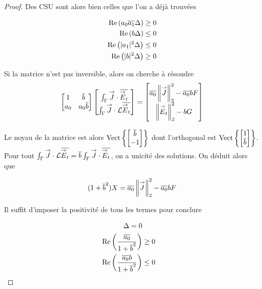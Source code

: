 \begin{proof}
        Des CSU sont alors bien celles que l'on a déjà trouvées

          \begin{align}
          \operatorname{Re}\left(a_0{\overline{a_1}}\Delta\right) &\ge 0
          \\
          \operatorname{Re}\left(b\Delta\right) &\le 0
          \\
          \operatorname{Re}\left(|a_1|^2\Delta\right) &\le 0
          \\
          \operatorname{Re}\left(|b|^2\Delta\right) &\ge 0
        \end{align}

        Si la matrice n'est pas inversible, alors on cherche à résoudre
        \[
          \begin{bmatrix}
            1 & {\overline{b}} \\
            a_0 & a_0{\overline{b}}
          \end{bmatrix}
          \begin{bmatrix}
            \int_\Gamma {\overset{\rightarrow}{J}} \cdot {\overline{{\overset{\rightarrow}{E}}_t}} \\
            \int_\Gamma {\overset{\rightarrow}{J}} \cdot \mathcal{L}{\overline{{\overset{\rightarrow}{E}}_t}}
          \end{bmatrix}
          =
          \begin{bmatrix}
            {\overline{a_0}}\left\lVert{\overset{\rightarrow}{J}}\right\rVert_2^2 - {\overline{a_0}}bF
            \\
            \left\lVert{\overset{\rightarrow}{E}}_t\right\rVert_2^2 - bG
          \end{bmatrix}
        \]

        Le noyau de la matrice est alors \(\operatorname{Vect}\left\lbrace\begin{bmatrix}{\overline{b}}\\-1\end{bmatrix}\right\rbrace\) dont l'orthogonal est  \(\operatorname{Vect}\left\lbrace\begin{bmatrix}1\\{\overline{b}}\end{bmatrix}\right\rbrace\).
        Pour tout \(\int_\Gamma {\overset{\rightarrow}{J}}\cdot \mathcal{L}{\overline{{\overset{\rightarrow}{E}}_t}} = {\overline{b}} \int_\Gamma {\overset{\rightarrow}{J}} \cdot {\overline{{\overset{\rightarrow}{E}}_t}} \), on a unicité des solutions. On déduit alors que

        \[
          (1 + {\overline{b}}^2) X = {\overline{a_0}} \left\lVert{\overset{\rightarrow}{J}}\right\rVert_2^2 - {\overline{a_0}}bF
        \]

        Il suffit d'imposer la positivité de tous les termes pour conclure

        \begin{align}
          \Delta = 0 \\
          \operatorname{Re}\left(\dfrac{{\overline{a_0}}}{1 + {\overline{b}}^2}\right) &\ge 0 \\
          \operatorname{Re}\left(\dfrac{{\overline{a_0}}b}{1 + {\overline{b}}^2}\right) &\le 0
        \end{align}

      \end{proof}


